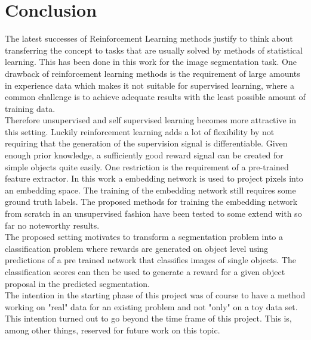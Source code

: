 \chapter{Conclusion}\label{chap:conclus}
The latest successes of Reinforcement Learning methods justify to think about transferring the concept to tasks that are usually solved by methods of statistical learning. This has been done in this work for the image segmentation task. One drawback of reinforcement learning methods is the requirement of large amounts in experience data which makes it not suitable for supervised learning, where a common challenge is to achieve adequate results with the least possible amount of training data.\\
Therefore unsupervised and self supervised learning becomes more attractive in this setting. Luckily reinforcement learning adds a lot of flexibility by not requiring that the generation of the supervision signal is differentiable. Given enough prior knowledge, a sufficiently good reward signal can be created for simple objects quite easily. One restriction is the requirement of a pre-trained feature extractor. In this work a embedding network is used to project pixels into an embedding space. The training of the embedding network still requires some ground truth labels. The proposed methods for training the embedding network from scratch in an unsupervised fashion have been tested to some extend with so far no noteworthy results.\\
The proposed setting motivates to transform a segmentation problem into a classification problem where rewards are generated on object level using predictions of a pre trained network that classifies images of single objects. The classification scores can then be used to generate a reward for a given object proposal in the predicted segmentation.\\
The intention in the starting phase of this project was of course to have a method working on "real" data for an existing problem and not "only" on a toy data set. This intention turned out to go beyond the time frame of this project. This is, among other things, reserved for future work on this topic.
